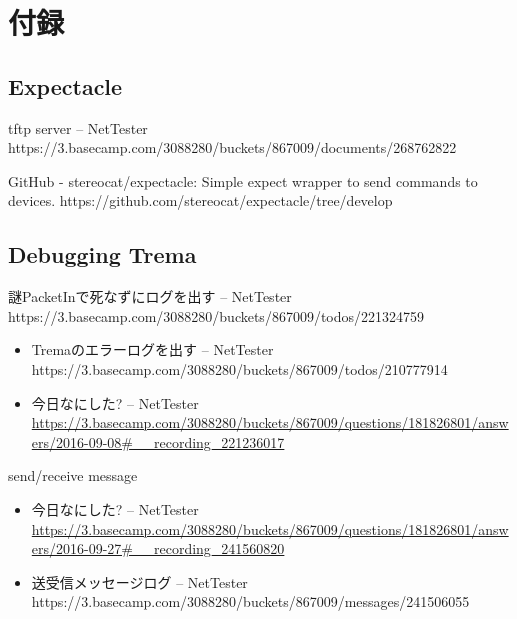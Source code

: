 
\chapter{付録}

 \section{Expectacle}

tftp server – NetTester https://3.basecamp.com/3088280/buckets/867009/documents/268762822

GitHub - stereocat/expectacle: Simple expect wrapper to send commands to devices. https://github.com/stereocat/expectacle/tree/develop

\section{Debugging Trema}

謎PacketInで死なずにログを出す – NetTester https://3.basecamp.com/3088280/buckets/867009/todos/221324759

\begin{itemize}
 \item Tremaのエラーログを出す – NetTester https://3.basecamp.com/3088280/buckets/867009/todos/210777914
 \item 今日なにした? – NetTester \url{https://3.basecamp.com/3088280/buckets/867009/questions/181826801/answers/2016-09-08#__recording_221236017}
\end{itemize}

send/receive message

\begin{itemize}
 \item 今日なにした? – NetTester \url{https://3.basecamp.com/3088280/buckets/867009/questions/181826801/answers/2016-09-27#__recording_241560820}
 \item 送受信メッセージログ – NetTester https://3.basecamp.com/3088280/buckets/867009/messages/241506055
\end{itemize}

